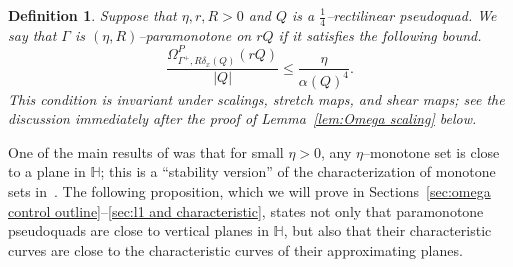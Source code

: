 \documentclass[11pt,reqno]{amsart}
\renewcommand{\H}{\mathbb{H}}
\newcommand{\0}{\mathbf{0}}
\renewcommand{\1}{\mathbf 1}
\renewcommand{\le}{\leqslant}
\newtheorem{defn}[thm]{Definition}
\theoremstyle{remark}
\begin{document}
\begin{defn}\label{def:paramonotone}
  Suppose that $\eta,r,R>0$ and $Q$ is a $\frac{1}{4}$--rectilinear pseudoquad.  We say that $\Gamma$ is \emph{$(\eta, R)$--paramonotone} on $rQ$ if it satisfies the following bound.
  \begin{equation}\label{eq:def paramonotone}
   \frac{\Omega^P_{\Gamma^+,R\delta_x(Q)}(r Q)}{|Q|}\le \frac{\eta}{\alpha(Q)^{4}}.
  \end{equation}
  This condition is invariant under scalings, stretch maps, and shear maps; see the discussion immediately after the proof of Lemma~\ref{lem:Omega scaling} below.
\end{defn}

One of the main results of \cite{CKN} was that for small $\eta>0$, any $\eta$--monotone set is close to a plane in $\H$; this is a ``stability version'' of the characterization of monotone sets in~\cite{CheegerKleinerMetricDiff}.  The following proposition, which we will prove in Sections~\ref{sec:omega control outline}--\ref{sec:l1 and characteristic}, states not only that paramonotone pseudoquads are close to vertical planes in $\H$, but also that their characteristic curves are close to the characteristic curves of their approximating planes.
\end{document}
